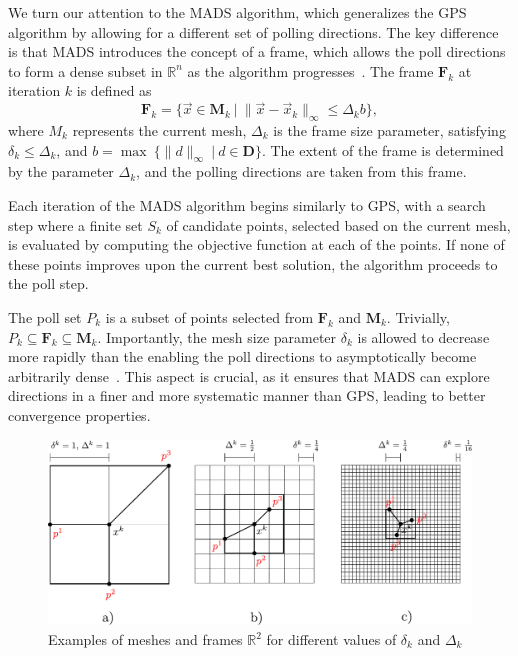 We turn our attention to the MADS algorithm, which generalizes the GPS algorithm by allowing for a different set of polling directions. The key difference is that MADS introduces the concept of a frame, which allows the poll directions to form a dense subset in $ \mathbb{R}^{n} $ as the algorithm progresses~\cite{BBO-textbook, derivative-free-review}. The frame $\mathbf{F}_k$ at iteration $k$ is defined as
\begin{equation}
	\mathbf{F}_k = \{ \vec{x} \in \mathbf{M}_k \ \big| \ \| \vec{x} - \vec{x}_k \|_\infty \leq \Delta_k b \},
\end{equation}
where $M_k$ represents the current mesh, $ \Delta_k $ is the frame size parameter, satisfying $ \delta_k \leq \Delta_k $, and $b = \max \ \{ \| d \| _\infty \ \big| \ d \in \mathbf{D} \}$. The extent of the frame is determined by the parameter $ \Delta_k $, and the polling directions are taken from this frame.

Each iteration of the MADS algorithm begins similarly to GPS, with a search step where a finite set $S_k$ of candidate points, selected based on the current mesh, is evaluated by computing the objective function at each of the points. If none of these points improves upon the current best solution, the algorithm proceeds to the poll step. 
 
The poll set $P_k$ is a subset of points selected from $\mathbf{F}_k$ and $\mathbf{M}_k$. Trivially, $P_k \subseteq \mathbf{F}_k \subseteq \mathbf{M}_k$. Importantly, the mesh size parameter $ \delta_k $ is allowed to decrease more rapidly than the  enabling the poll directions to asymptotically become arbitrarily dense~\cite{Audet2006}. This aspect is crucial, as it ensures that MADS can explore directions in a finer and more systematic manner than GPS, leading to better convergence properties.


\begin{figure}[H]
	\centering
	\vspace{0.5cm}
	\includegraphics[width=1.01\textwidth]{figures/mads.pdf}
	\caption{Examples of meshes and frames $\mathbb{R}^2$ for different
		values of $\delta_k$ and $\Delta_k$}
	\label{fig:mads}
\end{figure}


